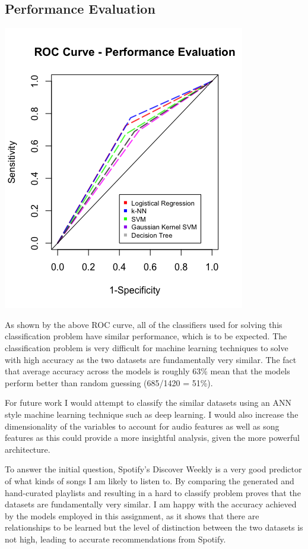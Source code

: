\documentclass{article}
\begin{document}
		\subsection{Performance Evaluation}
		\includegraphics[width=\textwidth]{roc_curve} 
		
		As shown by the above ROC curve, all of the classifiers used for solving this classification problem have similar performance, which is to be expected. The classification problem is very difficult for machine learning techniques to solve with high accuracy as the two datasets are fundamentally very similar. The fact that average accuracy across the models is roughly 63\% mean that the models perform better than random guessing (685/1420 = 51\%).
				
		For future work I would attempt to classify the similar datasets using an ANN style machine learning technique such as deep learning. I would also increase the dimensionality of the variables to account for audio features as well as song features as this could provide a more insightful analysis, given the more powerful architecture.
		
			To answer the initial question, Spotify's Discover Weekly is a very good predictor of what kinds of songs I am likely to listen to. By comparing the generated and hand-curated playlists and resulting in a hard to classify problem proves that the datasets are fundamentally very similar. I am happy with the accuracy achieved by the models employed in this assignment, as it shows that there are relationships to be learned but the level of distinction between the two datasets is not high, leading to accurate recommendations from Spotify.
						 	
\end{document}
